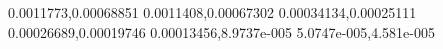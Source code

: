 0.0011773,0.00068851
0.0011408,0.00067302
0.00034134,0.00025111
0.00026689,0.00019746
0.00013456,8.9737e-005
5.0747e-005,4.581e-005